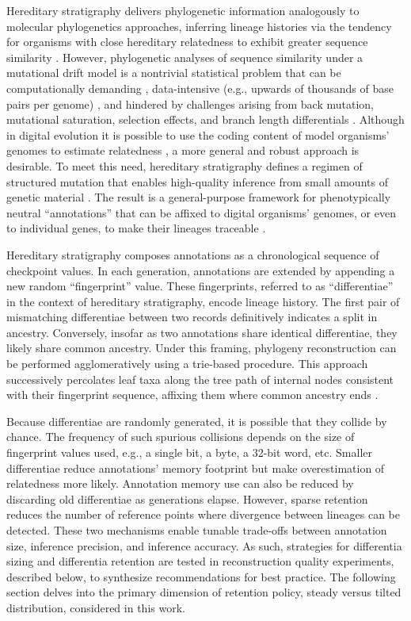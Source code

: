 Hereditary stratigraphy delivers phylogenetic information analogously to molecular phylogenetics approaches, inferring lineage histories via the tendency for organisms with close hereditary relatedness to exhibit greater sequence similarity \citep{yang2012molecular}.
However, phylogenetic analyses of sequence similarity under a mutational drift model is a nontrivial statistical problem \citep{neyman1971molecular} that can be computationally demanding \citep{konno2022deep,stamatakis2013novel}, data-intensive (e.g., upwards of thousands of base pairs per genome) \citep{parks2009increasing,cloutier2019whole,wortley2005much}, and hindered by challenges arising from back mutation, mutational saturation, selection effects, and branch length differentials \citep{brocchieri2001phylogenetic,moreira2000molecular}.
Although in digital evolution it is possible to use the coding content of model organisms' genomes to estimate relatedness \citep{moreno2021case}, a more general and robust approach is desirable.
To meet this need, hereditary stratigraphy defines a regimen of structured mutation that enables high-quality inference from small amounts of genetic material \citep{moreno2022hereditary}.
The result is a general-purpose framework for phenotypically neutral ``annotations'' that can be affixed to digital organisms' genomes, or even to individual genes, to make their lineages traceable \citep{moreno2022hstrat}.

Hereditary stratigraphy composes annotations as a chronological sequence of checkpoint values.
In each generation, annotations are extended by appending a new random ``fingerprint'' value.
These fingerprints, referred to as ``differentiae'' in the context of hereditary stratigraphy, encode lineage history.
The first pair of mismatching differentiae between two records definitively indicates a split in ancestry.
Conversely, insofar as two annotations share identical differentiae, they likely share common ancestry.
Under this framing, phylogeny reconstruction can be performed agglomeratively using a trie-based procedure.
This approach successively percolates leaf taxa along the tree path of internal nodes consistent with their fingerprint sequence, affixing them where common ancestry ends \citep{moreno2024analysis}.

Because differentiae are randomly generated, it is possible that they collide by chance.
The frequency of such spurious collisions depends on the size of fingerprint values used, e.g., a single bit, a byte, a 32-bit word, etc.
Smaller differentiae reduce annotations' memory footprint but make overestimation of relatedness more likely.
Annotation memory use can also be reduced by discarding old differentiae as generations elapse.
However, sparse retention reduces the number of reference points where divergence between lineages can be detected.
These two mechanisms enable tunable trade-offs between annotation size, inference precision, and inference accuracy.
As such, strategies for differentia sizing and differentia retention are tested in reconstruction quality experiments, described below, to synthesize recommendations for best practice.
The following section delves into the primary dimension of retention policy, steady versus tilted distribution, considered in this work.

